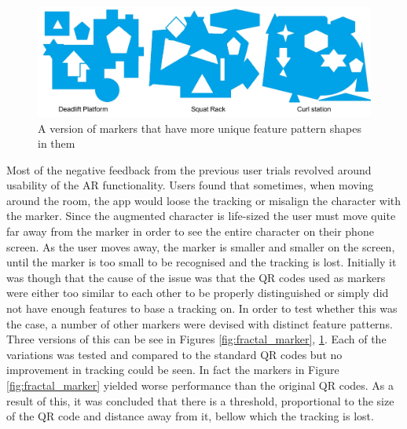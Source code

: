 \documentclass{l4proj}
\begin{document}
\begin{figure}
\centering
\includegraphics[width=\textwidth]{images/paint_marker.png}
\caption{A version of markers that have more unique feature pattern shapes in them} 
\label{fig:paint_marker}
\end{figure}

Most of the negative feedback from the previous user trials revolved around usability of the AR functionality. Users found that sometimes, when moving around the room, the app would loose the tracking or misalign the character with the marker. Since the augmented character is life-sized the user must move quite far away from the marker in order to see the entire character on their phone screen. As the user moves away, the marker is smaller and smaller on the screen, until the marker is too small to be recognised and the tracking is lost. Initially it was though that the cause of the issue was that the QR codes used as markers were either too similar to each other to be properly distinguished or simply did not have enough features to base a tracking on. In order to test whether this was the case, a number of other markers were devised with distinct feature patterns. Three versions of this can be see in Figures \ref{fig:fractal_marker}, \ref{fig:paint_marker}. Each of the variations was tested and compared to the standard QR codes but no improvement in tracking could be seen. In fact the markers in Figure \ref{fig:fractal_marker} yielded worse performance than the original QR codes. As a result of this, it was concluded that there is a threshold, proportional to the size of the QR code and distance away from it, bellow which the tracking is lost. 
\end{document}
